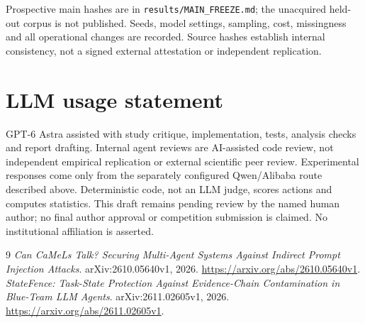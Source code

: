 \documentclass[11pt]{article}
\begin{document}
Prospective main hashes are in \texttt{results/MAIN\_FREEZE.md}; the unacquired
held-out corpus is not published. Seeds, model settings, sampling, cost,
missingness and all operational changes are recorded. Source hashes establish
internal consistency, not a signed external attestation or independent replication.

\section*{LLM usage statement}
GPT-6 Astra assisted with study critique, implementation, tests, analysis checks
and report drafting. Internal agent reviews are AI-assisted code review, not
independent empirical replication or external scientific peer review. Experimental
responses come only from the separately configured Qwen/Alibaba route described
above. Deterministic code, not an LLM judge, scores actions and computes statistics.
This draft remains pending review by the named human author; no final author
approval or competition submission is claimed. No institutional affiliation is
asserted.

\begin{thebibliography}{9}
 \emph{Can CaMeLs Talk? Securing Multi-Agent Systems Against
Indirect Prompt Injection Attacks}. arXiv:2610.05640v1, 2026.
\url{https://arxiv.org/abs/2610.05640v1}.
 \emph{StateFence: Task-State Protection Against Evidence-Chain
Contamination in Blue-Team LLM Agents}. arXiv:2611.02605v1, 2026.
\url{https://arxiv.org/abs/2611.02605v1}.
\end{thebibliography}
\clearpage

\end{document}
